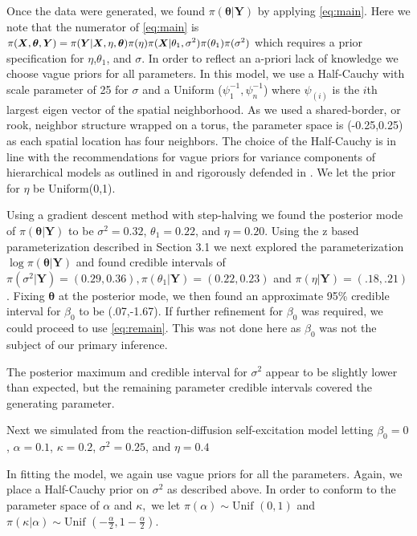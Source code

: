 \documentclass[11pt]{isuthesis}
\begin{document}
Once the data were generated, we found $\pi(\boldsymbol{\theta}|\boldsymbol{Y})$ by applying \eqref{eq:main}.  Here we note that the numerator of \eqref{eq:main} is $\small\pi(\boldsymbol{X},\boldsymbol{\theta},\boldsymbol{Y})=\pi(\boldsymbol{Y}|\boldsymbol{X},\eta,\boldsymbol{\theta})\pi(\eta)\pi(\boldsymbol{X}|\theta_1,\sigma^2)\pi(\theta_1)\pi(\sigma^2)$ which requires a prior specification for $\eta$,$\theta_1$, and $\sigma$.  In order to reflect an a-priori lack of knowledge we choose vague priors for all parameters.   In this model, we use a Half-Cauchy with scale parameter of 25 for $\sigma$ and a Uniform ($\psi_{1}^{-1},\psi_{n}^{-1}$) where $\psi_(i)$ is the $i$th largest eigen vector of the spatial neighborhood.  As we used a shared-border, or rook, neighbor structure wrapped on a torus, the parameter space is (-0.25,0.25) as each spatial location has four neighbors.  The choice of the Half-Cauchy is in line with the recommendations for vague priors for variance components of hierarchical models as outlined in \cite{gelman2006prior} and rigorously defended in \cite{polson2012half}.  We let the prior for $\eta$ be Uniform(0,1).  

Using a gradient descent method with step-halving we found the posterior mode of $\pi(\boldsymbol{\theta}|\boldsymbol{Y})$ to be $\sigma^2=0.32$, $\theta_1=0.22$, and $\eta=0.20$. Using the z based parameterization described in Section 3.1 we next explored the parameterization $\log\pi(\boldsymbol{\theta}|\boldsymbol{Y})$ and found credible intervals of $\pi(\sigma^2|\boldsymbol{Y})=(0.29,0.36),\pi(\theta_1|\boldsymbol{Y})=(0.22,0.23)$ and $\pi(\eta|\boldsymbol{Y})=(.18,.21)$.  Fixing $\boldsymbol{\theta}$ at the posterior mode, we then found an approximate 95\% credible interval for $\beta_0$ to be (.07,-1.67).  If further refinement for $\beta_0$ was required, we could proceed to use \eqref{eq:remain}.  This was not done here as $\beta_0$ was not the subject of our primary inference.

The posterior maximum and credible interval for $\sigma^2$ appear to be slightly lower than expected, but the remaining parameter credible intervals covered the generating parameter.  

Next we simulated from the reaction-diffusion self-excitation model letting $\beta_0=0$, $\alpha=0.1$, $\kappa=0.2$, $\sigma^2=0.25$, and $\eta=0.4$ 

In fitting the model, we again use vague priors for all the parameters.  Again, we place a Half-Cauchy prior on $\sigma^2$ as described above.  In order to conform to the parameter space of $\alpha$ and $\kappa,$ we let $\pi(\alpha)\sim \text{Unif }(0,1)$ and $\pi(\kappa|\alpha)\sim\text{Unif }(-\frac{\alpha}{2},1-\frac{\alpha}{2})$.
\end{document}
